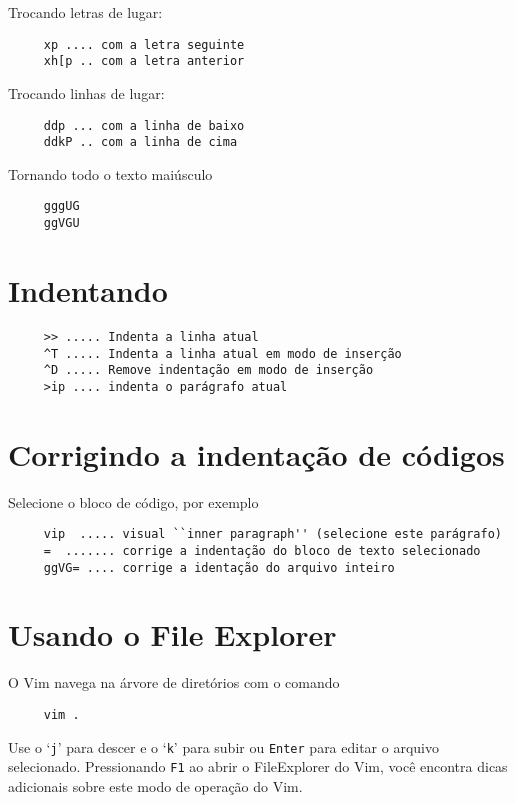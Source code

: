 Trocando letras de lugar:

\begin{verbatim}
     xp .... com a letra seguinte
     xh[p .. com a letra anterior
\end{verbatim}

Trocando linhas de lugar:

\begin{verbatim}
     ddp ... com a linha de baixo
     ddkP .. com a linha de cima
\end{verbatim}

Tornando todo o texto maiúsculo

\begin{verbatim}
     gggUG
     ggVGU
\end{verbatim}

\section{Indentando }

\begin{verbatim}
     >> ..... Indenta a linha atual
     ^T ..... Indenta a linha atual em modo de inserção
     ^D ..... Remove indentação em modo de inserção
     >ip .... indenta o parágrafo atual
\end{verbatim}

\section{Corrigindo a indentação de códigos}
\label{Corrigindo a indentação de códigos}
Selecione o bloco de código, por exemplo

\begin{verbatim}
     vip  ..... visual ``inner paragraph'' (selecione este parágrafo)
     =  ....... corrige a indentação do bloco de texto selecionado
     ggVG= .... corrige a identação do arquivo inteiro
\end{verbatim}

\section{Usando o File Explorer}
\label{Usando o file explorer}
O Vim navega na árvore de diretórios com o comando

\begin{verbatim}
     vim .
\end{verbatim}

Use o `{\tt j}' para descer e o `{\tt k}' para subir ou {\tt Enter} para editar o
arquivo selecionado. {\Large {}}  Pressionando {\tt F1} ao abrir o
FileExplorer do Vim, você encontra dicas adicionais sobre este modo de
operação do Vim.

